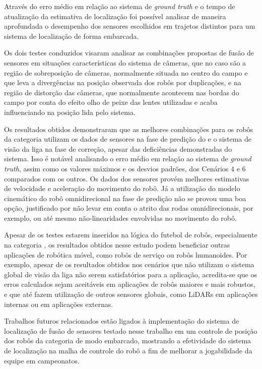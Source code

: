 \documentclass[acronym, symbols, table]{fei}
\begin{document}
	Através do erro médio em relação ao sistema de \textit{ground truth} e o tempo de atualização da estimativa de localização foi possível analisar de maneira aprofundada o desempenho dos sensores escolhidos em trajetos distintos para um sistema de localização de forma embarcada.
	
	Os dois testes conduzidos visaram analisar as combinações propostas de fusão de sensores em situações características do sistema de câmeras, que no caso são a região de sobreposição de câmeras, normalmente situada no centro do campo e que leva a divergências na posição observada dos robôs por duplicações, e na região de distorção das câmeras, que normalmente acontecem nas bordas do campo por conta do efeito olho de peixe das lentes utilizadas e acaba influenciando na posição lida pelo sistema.
	
	Os resultados obtidos demonstraram que as melhores combinações para os robôs da categoria  utilizam os dados de sensores na fase de predição do  e o sistema de visão da liga na fase de correção, apesar das deficiências demonstradas do sistema. Isso é notável analisando o erro médio em relação ao sistema de \textit{ground truth}, assim como os valores máximos e os desvios padrões, dos Cenários 4 e 6 comparados com os outros. Os dados dos sensores provém melhores estimativas de velocidade e aceleração do movimento do robô. Já a utilização do modelo cinemático do robô omnidirecional na fase de predição não se provou uma boa opção, justificado por não levar em conta o atrito das rodas omnidirecionais, por exemplo, ou até mesmo não-linearidades envolvidas no movimento do robô.
	
	Apesar de os testes estarem inseridos na lógica do futebol de robôs, especialmente na categoria , os resultados obtidos nesse estudo podem beneficiar outras aplicações de robótica móvel, como robôs de serviço ou robôs humanoides. Por exemplo, apesar de os resultados obtidos nos cenários que não utilizam o sistema global de visão da liga não serem satisfatórios para a aplicação, acredita-se que os erros calculados sejam aceitáveis em aplicações de robôs maiores e mais robustos, e que até fazem utilização de outros sensores globais, como LiDARs em aplicações internas ou  em aplicações externas.
	
	Trabalhos futuros relacionados estão ligados à implementação do sistema de localização de fusão de sensores testado nesse trabalho em um controle de posição dos robôs da categoria de modo embarcado, mostrando a efetividade do sistema de localização na malha de controle do robô a fim de melhorar a jogabilidade da equipe em campeonatos.
	
\printbibliography
\end{document}
